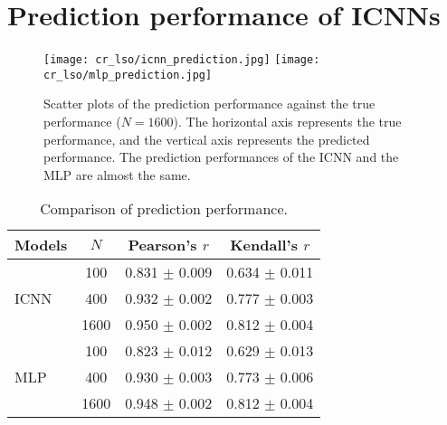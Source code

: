 \documentclass[10pt,twocolumn,letterpaper]{article}
\begin{document}
\section{Prediction performance of ICNNs}
\begin{figure}[htbp]
	\centering
	\texttt{[image: cr\_lso/icnn\_prediction.jpg]}
	\texttt{[image: cr\_lso/mlp\_prediction.jpg]}
	\caption{Scatter plots of the prediction performance against the true performance ($N=1600$). The horizontal axis represents the true performance, and the vertical axis represents the predicted performance. The prediction performances of the ICNN and the MLP are almost the same.}
	\label{fig:prediction_performance}
\end{figure}
\begin{table}[htbp]
	\centering
	\caption{Comparison of prediction performance.}
	\begin{tabular}{lccc}
		\toprule
		Models & $N$ & Pearson's $r$ & Kendall's $r$ \\
		\midrule
		\multirow{3}{*}{ICNN} & 100 & 0.831 $\pm$ 0.009 & 0.634 $\pm$ 0.011 \\
		{} & 400 & 0.932 $\pm$ 0.002 & 0.777 $\pm$ 0.003 \\
		{} & 1600 & 0.950 $\pm$ 0.002 & 0.812 $\pm$ 0.004 \\		
		\midrule
		\multirow{3}{*}{MLP} & 100 & 0.823 $\pm$ 0.012 & 0.629 $\pm$ 0.013 \\
		{} & 400 & 0.930 $\pm$ 0.003 & 0.773 $\pm$ 0.006 \\
		{} & 1600 & 0.948 $\pm$ 0.002 & 0.812 $\pm$ 0.004 \\
		\bottomrule
	\end{tabular}
	\label{tab:prediction_performance}
\end{table}
\end{document}
